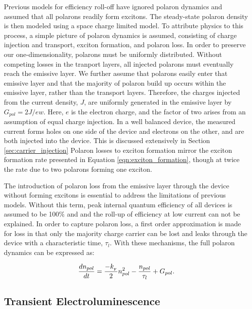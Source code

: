 \documentclass[../thesis.tex]{subfiles}
\begin{document}
Previous models for efficiency roll-off have ignored polaron dynamics and assumed that all polarons readily form excitons.  The steady-state polaron density is then modeled using a space charge limited model.\cite{Pope1999}
To attribute physics to this process, a simple picture of polaron dynamics is assumed, consisting of charge injection and transport, exciton formation, and polaron loss.  
In order to preserve our one-dimensionality, polarons must be uniformly distributed.  
Without competing losses in the tranport layers, all injected polarons must eventually reach the emissive layer.  
We further assume that polarons easily enter that emissive layer and that the majority of polaron build up occurs within the emissive layer, rather than the transport layers.
Therefore, the charges injected from the current density, $J$, are uniformly generated in the emissive layer by $G_{pol}=2J/ew$.  Here, $e$ is the electron charge, and the factor of two arises from an assumption of equal charge injection.  In a well balanced device, the measured current forms holes on one side of the device and electrons on the other, and are both injected into the device.  
This is discussed extensively in Section \ref{sec:carrier_injection}
Polaron losses to exciton formation mirror the exciton formation rate presented in Equation \ref{eqn:exciton_formation}, though at twice the rate due to two polarons forming one exciton.

The introduction of polaron loss from the emissive layer through the device without forming excitons is essential to address the limitations of previous models.  
Without this term, peak internal quantum efficiency of all devices is assumed to be 100\% and and the roll-up of efficiency at low current can not be explained.  
In order to capture polaron loss, a first order approximation is made for loss in that only the majority charge carrier can be lost and leaks through the device with a characteristic time, $\tau_l$.
With these mechanisms, the full polaron dynamics can be expressed as:




\begin{equation}
\frac{dn_{pol}}{dt}=\frac{-k_{_\text{\tiny F}}}{2}n_{pol}^2-\frac{n_{pol}}{\tau_l}+G_{pol}.
\label{eqn:polaron_rate}
\end{equation}

\subsection{Transient Electroluminescence} \label{sec:transient_el}
\end{document}

